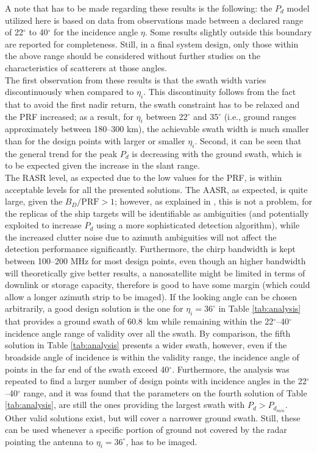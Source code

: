 \documentclass[conference,a4paper]{IEEEtran}
\begin{document}
    A note that has to be made regarding these results is the following: the $P_d$ model utilized here is based on data from observations made between a declared range of 22$^\circ$ to 40$^\circ$ for the incidence angle $\eta$.
    Some results slightly outside this boundary are reported for completeness.
    Still, in a final system design, only those within the above range should be considered without further studies on the characteristics of scatterers at those angles.\\
    The first observation from these results is that the swath width varies discontinuously when compared to $\eta_i$.
    This discontinuity follows from the fact that to avoid the first nadir return, the swath constraint has to be relaxed and the PRF increased;
    as a result, for $\eta_i$ between 22$^\circ$ and 35$^\circ$ (i.e., ground ranges approximately between 180--300 km), the achievable swath width is much smaller than for the design points with larger or smaller $\eta_i$.
    Second, it can be seen that the general trend for the peak $P_d$ is decreasing with the ground swath, which is to be expected given the increase in the slant range.\\
    The RASR level, as expected due to the low values for the PRF, is within acceptable levels for all the presented solutions.
    The AASR, as expected, is quite large, given the $B_D/\text{PRF}>1$; however, as explained in \cite{DLRjournal}, this is not a problem, for the replicas of the ship targets will be identifiable as ambiguities (and potentially exploited to increase $P_d$ using a more sophisticated detection algorithm), while the increased clutter noise due to azimuth ambiguities will not affect the detection performance significantly.
    Furthermore, the chirp bandwidth is kept between 100--200 MHz for most design points, even though an higher bandwidth will theoretically give better results, a nanosatellite might be limited in terms of downlink or storage capacity, therefore is good to have some margin (which could allow a longer azimuth strip to be imaged).
    If the looking angle can be chosen arbitrarily, a good design solution is the one for $\eta_i=36^\circ$ in Table \ref{tab:analysis} that provides a ground swath of 60.8~km while remaining within the 22$^\circ$--40$^\circ$ incidence angle range of validity over all the swath.
    By comparison, the fifth solution in Table \ref{tab:analysis} presents a wider swath, however, even if the broadside angle of incidence is within the validity range, the incidence angle of points in the far end of the swath exceed 40$^\circ$.
    Furthermore, the analysis was repeated to find a larger number of design points with incidence angles in the 22$^\circ$--40$^\circ$ range, and it was found that the parameters on the fourth solution of Table \ref{tab:analysis}, are still the ones providing the largest swath with $P_d>P_{d_{min}}$.
    Other valid solutions exist, but will cover a narrower ground swath.
    Still, these can be used whenever a specific portion of ground not covered by the radar pointing the antenna to $\eta_i=36^\circ$, has to be imaged.
\end{document}

